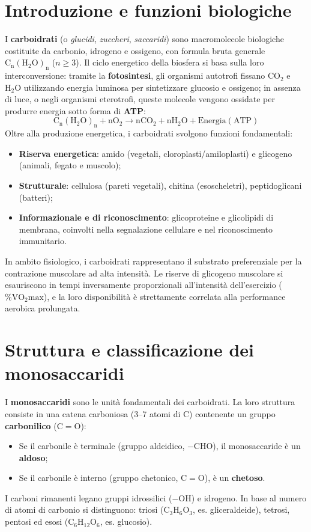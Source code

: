 \documentclass[12pt,a4paper]{report}
\begin{document}
\section{Introduzione e funzioni biologiche}
I \textbf{carboidrati} (o \textit{glucidi}, \textit{zuccheri}, \textit{saccaridi}) sono macromolecole biologiche costituite da carbonio, idrogeno e ossigeno, con formula bruta generale \(\mathrm{C_n(H_2O)_n}\) (\(n \geq 3\)). Il ciclo energetico della biosfera si basa sulla loro interconversione: tramite la \textbf{fotosintesi}, gli organismi autotrofi fissano \(\mathrm{CO_2}\) e \(\mathrm{H_2O}\) utilizzando energia luminosa per sintetizzare glucosio e ossigeno; in assenza di luce, o negli organismi eterotrofi, queste molecole vengono ossidate per produrre energia sotto forma di \textbf{ATP}:
\[
\mathrm{C_n(H_2O)_n + nO_2 \rightarrow nCO_2 + nH_2O + Energia (ATP)}
\]
Oltre alla produzione energetica, i carboidrati svolgono funzioni fondamentali:
\begin{itemize}
\item \textbf{Riserva energetica}: amido (vegetali, cloroplasti/amiloplasti) e glicogeno (animali, fegato e muscolo);
\item \textbf{Strutturale}: cellulosa (pareti vegetali), chitina (esoscheletri), peptidoglicani (batteri);
\item \textbf{Informazionale e di riconoscimento}: glicoproteine e glicolipidi di membrana, coinvolti nella segnalazione cellulare e nel riconoscimento immunitario.
\end{itemize}
In ambito fisiologico, i carboidrati rappresentano il substrato preferenziale per la contrazione muscolare ad alta intensità. Le riserve di glicogeno muscolare si esauriscono in tempi inversamente proporzionali all'intensità dell'esercizio (\(\% \mathrm{VO_2max}\)), e la loro disponibilità è strettamente correlata alla performance aerobica prolungata.

\section{Struttura e classificazione dei monosaccaridi}
I \textbf{monosaccaridi} sono le unità fondamentali dei carboidrati. La loro struttura consiste in una catena carboniosa (3--7 atomi di C) contenente un gruppo \textbf{carbonilico} (\(\mathrm{C=O}\)):
\begin{itemize}
\item Se il carbonile è terminale (gruppo aldeidico, \(-\mathrm{CHO}\)), il monosaccaride è un \textbf{aldoso};
\item Se il carbonile è interno (gruppo chetonico, \(\mathrm{C=O}\)), è un \textbf{chetoso}.
\end{itemize}
I carboni rimanenti legano gruppi idrossilici (\(-\mathrm{OH}\)) e idrogeno. In base al numero di atomi di carbonio si distinguono: triosi (\(\mathrm{C_3H_6O_3}\), es. gliceraldeide), tetrosi, pentosi ed esosi (\(\mathrm{C_6H_{12}O_6}\), es. glucosio).
\end{document}
